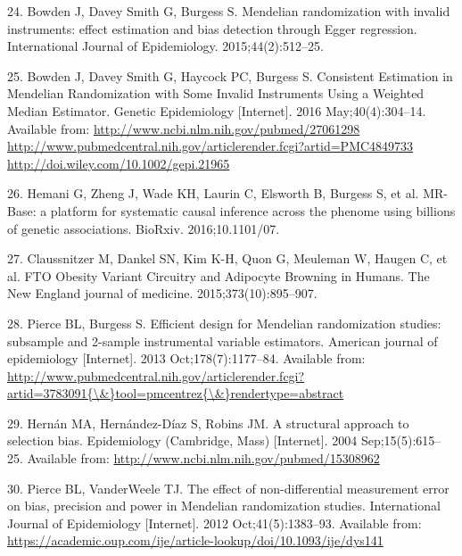\documentclass[]{article}
\begin{document}
\hypertarget{ref-Bowden2015}{}
24. Bowden J, Davey Smith G, Burgess S. Mendelian randomization with
invalid instruments: effect estimation and bias detection through Egger
regression. International Journal of Epidemiology. 2015;44(2):512--25.

\hypertarget{ref-Bowden2016b}{}
25. Bowden J, Davey Smith G, Haycock PC, Burgess S. Consistent
Estimation in Mendelian Randomization with Some Invalid Instruments
Using a Weighted Median Estimator. Genetic Epidemiology {[}Internet{]}.
2016 May;40(4):304--14. Available from:
\href{http://www.ncbi.nlm.nih.gov/pubmed/27061298\%20http://www.pubmedcentral.nih.gov/articlerender.fcgi?artid=PMC4849733\%20http://doi.wiley.com/10.1002/gepi.21965}{http://www.ncbi.nlm.nih.gov/pubmed/27061298 http://www.pubmedcentral.nih.gov/articlerender.fcgi?artid=PMC4849733 http://doi.wiley.com/10.1002/gepi.21965}

\hypertarget{ref-Hemani2016}{}
26. Hemani G, Zheng J, Wade KH, Laurin C, Elsworth B, Burgess S, et al.
MR-Base: a platform for systematic causal inference across the phenome
using billions of genetic associations. BioRxiv. 2016;10.1101/07.

\hypertarget{ref-Claussnitzer2015}{}
27. Claussnitzer M, Dankel SN, Kim K-H, Quon G, Meuleman W, Haugen C, et
al. FTO Obesity Variant Circuitry and Adipocyte Browning in Humans. The
New England journal of medicine. 2015;373(10):895--907.

\hypertarget{ref-Pierce2013}{}
28. Pierce BL, Burgess S. Efficient design for Mendelian randomization
studies: subsample and 2-sample instrumental variable estimators.
American journal of epidemiology {[}Internet{]}. 2013
Oct;178(7):1177--84. Available from:
\href{http://www.pubmedcentral.nih.gov/articlerender.fcgi?artid=3783091\%7B/\&\%7Dtool=pmcentrez\%7B/\&\%7Drendertype=abstract}{http://www.pubmedcentral.nih.gov/articlerender.fcgi?artid=3783091\{\textbackslash{}\&\}tool=pmcentrez\{\textbackslash{}\&\}rendertype=abstract}

\hypertarget{ref-Hernan2004}{}
29. Hernán MA, Hernández-Díaz S, Robins JM. A structural approach to
selection bias. Epidemiology (Cambridge, Mass) {[}Internet{]}. 2004
Sep;15(5):615--25. Available from:
\url{http://www.ncbi.nlm.nih.gov/pubmed/15308962}

\hypertarget{ref-Pierce2012}{}
30. Pierce BL, VanderWeele TJ. The effect of non-differential
measurement error on bias, precision and power in Mendelian
randomization studies. International Journal of Epidemiology
{[}Internet{]}. 2012 Oct;41(5):1383--93. Available from:
\url{https://academic.oup.com/ije/article-lookup/doi/10.1093/ije/dys141}
\end{document}
